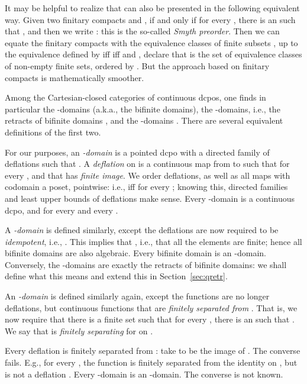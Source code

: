 \documentclass{LMCS}
\begin{document}
It may be helpful to realize that  can also be presented in
the following equivalent way.  Given two finitary compacts 
and ,  if and only if for every , there is an  such that , and then we
write : this is the so-called {\em Smyth
  preorder\/}.  Then we can equate the finitary compacts  with the equivalence classes of finite subsets , up to the
equivalence  defined by  iff 
iff  and , declare that 
is the set of equivalence classes of non-empty finite sets, ordered by
.  But the approach based on finitary compacts is
mathematically smoother.

Among the Cartesian-closed categories of continuous dcpos, one finds
in particular the -domains (a.k.a., the bifinite domains), the
-domains, i.e., the retracts of bifinite domains
\cite[Section~4.2.1]{AJ:domains}, and the -domains
\cite[Section~4.2.2]{AJ:domains}\cite[Section~II.2]{GHKLMS:contlatt}.
There are several equivalent definitions of the first two.

For our purposes, an {\em -domain\/} is a pointed dcpo  with a
directed family  of deflations such that  \cite[Exercise~4.3.11(9)]{AJ:domains}.  A
{\em deflation\/}  on  is a continuous map from  to  such
that  for every , and that has {\em finite
  image\/}.  We order deflations, as well as all maps with codomain a
poset, pointwise: i.e.,  iff  for every ; knowing this, directed families and least upper bounds of
deflations make sense.  Every -domain is a continuous dcpo, and
 for every  and every .

A {\em -domain\/} is defined similarly, except the deflations
 are now required to be {\em idempotent\/}, i.e.,  \cite[Theorem~4.2.6]{AJ:domains}.  This implies that , i.e., that all the elements  are finite; hence
all bifinite domains are also algebraic.  Every bifinite domain is an
-domain.  Conversely, the -domains are exactly the retracts
of bifinite domains: we shall define what this means and extend this
in Section~\ref{sec:qretr}.

An {\em -domain\/} is defined similarly again, except the
functions  are no longer deflations, but continuous functions
that are {\em finitely separated from \/}.  That is, we
now require that there is a finite set  such that for every , there is an  such that .  We
say that  is {\em finitely separating\/} for  on .

Every deflation is finitely separated from : take 
to be the image of .  The converse fails.  E.g., for every
, the function  is
finitely separated from the identity on , but is not a
deflation \cite[Section~3.2]{JT:troublesome}.  Every -domain is
an -domain.  The converse is not known.
\end{document}
